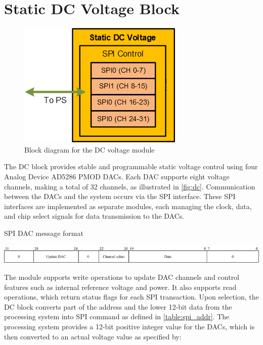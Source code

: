 \section{Static DC Voltage Block}
\begin{figure}[h]
    \centering
    \includegraphics[width=0.5\linewidth]{figures/5.2.png}
    \caption{Block diagram for the DC voltage module}
    \label{fig:dc}
\end{figure}
The DC block provides stable and programmable static voltage control using four Analog Device AD5286 PMOD DACs. Each DAC supports eight voltage channels, making a total of 32 channels, as illustrated in \autoref{fig:dc}. Communication between the DACs and the system occurs via the SPI interface. These SPI interfaces are implemented as separate modules, each managing the clock, data, and chip select signals for data transmission to the DACs.

\begin{table}[h]
\centering

\caption{SPI DAC message format \cite{ad5628}}

\includegraphics[width=1.0\textwidth]{figures/spi_addr.png}
\label{table:spi_addr}
\end{table}

The module supports write operations to update DAC channels and control features such as internal reference voltage and power. It also supports read operations, which return status flags for each SPI transaction. Upon selection, the DC block converts part of the address and the lower 12-bit data from the processing system into SPI command as defined in \autoref{table:spi_addr}. The processing system provides a 12-bit positive integer value for the DACs, which is then converted to an actual voltage value as specified by:

